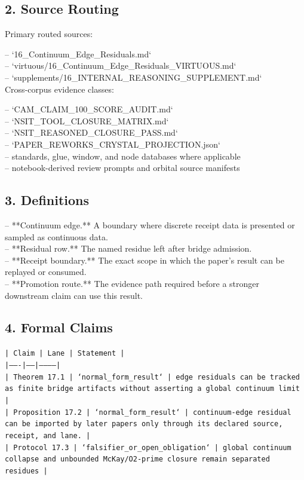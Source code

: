 \documentclass[11pt]{article}
\begin{document}
\subsection*{2. Source Routing}

Primary routed sources:

\noindent{}-- `16\_Continuum\_Edge\_Residuals.md`\\
\noindent{}-- `virtuous/16\_Continuum\_Edge\_Residuals\_VIRTUOUS.md`\\
\noindent{}-- `supplements/16\_INTERNAL\_REASONING\_SUPPLEMENT.md`\\

Cross-corpus evidence classes:

\noindent{}-- `CAM\_CLAIM\_100\_SCORE\_AUDIT.md`\\
\noindent{}-- `NSIT\_TOOL\_CLOSURE\_MATRIX.md`\\
\noindent{}-- `NSIT\_REASONED\_CLOSURE\_PASS.md`\\
\noindent{}-- `PAPER\_REWORKS\_CRYSTAL\_PROJECTION.json`\\
\noindent{}-- standards, glue, window, and node databases where applicable\\
\noindent{}-- notebook-derived review prompts and orbital source manifests\\

\subsection*{3. Definitions}

\noindent{}-- **Continuum edge.** A boundary where discrete receipt data is presented or sampled as continuous data.\\
\noindent{}-- **Residual row.** The named residue left after bridge admission.\\
\noindent{}-- **Receipt boundary.** The exact scope in which the paper's result can be replayed or consumed.\\
\noindent{}-- **Promotion route.** The evidence path required before a stronger downstream claim can use this result.\\

\subsection*{4. Formal Claims}

\noindent\texttt{| Claim | Lane | Statement |}\\
\noindent\texttt{|-------|------|-----------|}\\
\noindent\texttt{| Theorem 17.1 | `normal\_form\_result` | edge residuals can be tracked as finite bridge artifacts without asserting a global continuum limit |}\\
\noindent\texttt{| Proposition 17.2 | `normal\_form\_result` | continuum-edge residual can be imported by later papers only through its declared source, receipt, and lane. |}\\
\noindent\texttt{| Protocol 17.3 | `falsifier\_or\_open\_obligation` | global continuum collapse and unbounded McKay/O2-prime closure remain separated residues |}\\
\end{document}
